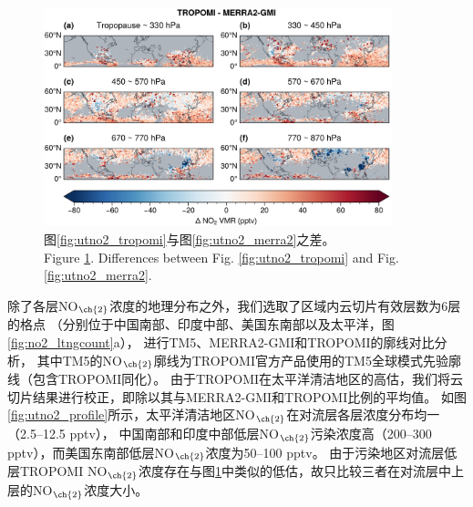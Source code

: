 \begin{figure}[H]
    \centering
    \includegraphics[width=0.9\textwidth]{./figures/utno2_delta.png}
    \caption{
    图\ref{fig:utno2_tropomi}与图\ref{fig:utno2_merra2}之差。 \\
    Figure \ref{fig:utno2_delta}. Differences between Fig. \ref{fig:utno2_tropomi} and Fig. \ref{fig:utno2_merra2}.
    }
    \label{fig:utno2_delta}
\end{figure}



除了各层NO$_{\ch{2}}$浓度的地理分布之外，我们选取了区域内云切片有效层数为6层的格点
（分别位于中国南部、印度中部、美国东南部以及太平洋，图\ref{fig:no2_ltngcount}a），
进行TM5、MERRA2-GMI和TROPOMI的廓线对比分析，
其中TM5的NO$_{\ch{2}}$廓线为TROPOMI官方产品使用的TM5全球模式先验廓线（包含TROPOMI同化）。
由于TROPOMI在太平洋清洁地区的高估，我们将云切片结果进行校正，即除以其与MERRA2-GMI和TROPOMI比例的平均值。
如图\ref{fig:utno2_profile}所示，太平洋清洁地区NO$_{\ch{2}}$在对流层各层浓度分布均一（2.5--12.5 pptv），
中国南部和印度中部低层NO$_{\ch{2}}$污染浓度高（200--300 pptv），而美国东南部低层NO$_{\ch{2}}$浓度为50--100 pptv。
由于污染地区对流层低层TROPOMI NO$_{\ch{2}}$浓度存在与图\ref{fig:utno2_delta}中类似的低估，故只比较三者在对流层中上层的NO$_{\ch{2}}$浓度大小。



